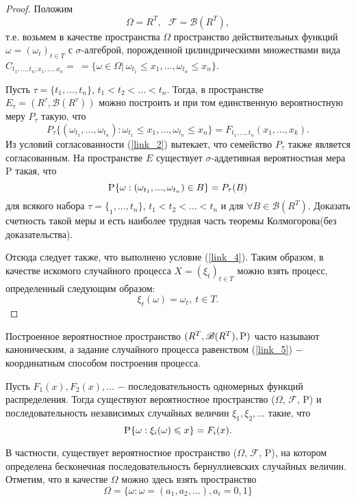 \begin{proof} Положим
$$\Omega = R^T, \ \ \  \mathscr{F} = \mathscr{B}(R^T),$$
т.е. возьмем в качестве пространства $\Omega$ пространство действительных функций $\omega = (\omega_t)_{t \in T}$ с $\sigma$-алгеброй, порожденной цилиндрическими множествами вида $C_{t_1,...,t_n;x_1,...,x_n} = \ =\{ \omega \in \Omega| \ \omega_{t_1} \leq x_1, ... , \omega_{t_n} \leq x_n\} $.

Пусть $\tau = \{t_1, ... , t_n\}$, $t_1 < t_2 < ... < t_n$. Тогда, в пространстве $E_\tau=(R^\tau, \mathscr{B}(R^\tau))$ можно построить и при том единственную вероятностную меру $P_\tau$ такую, что
\begin{equation} \label{link_4}
P_\tau \{(\omega_{t_1}, ... , \omega_{t_n}): \omega_{t_1} \leq x_1, ... , \omega_{t_n} \leq x_n \} = F_{t_1, ... , t_n}(x_1, ... , x_k).
\end{equation}
Из условий согласованности (\ref{link_2}) вытекает, что семейство ${P_\tau}$ также является согласованным. На пространстве $E$ существует $\sigma$-аддетивная вероятностная мера P такая, что 
$$\textsc{P}\{\omega: (\omega_{t_1}, ... , \omega_{t_n}) \in B\} = P_\tau(B)$$
для всякого набора $\tau = \{_1, ... , t_n\}$, $t_1 < t_2 < ... < t_n$ и для $\forall B \in \mathscr{B}(R^T)$. Доказать счетность такой меры и есть наиболее трудная часть теоремы Колмогорова(без доказательства).

Отсюда следует также, что выполнено условие (\ref{link_4}). Таким образом, в качестве искомого случайного процесса $X=(\xi_t)_{t \in T}$ можно взять процесс, определенный следующим образом:
\begin{equation} \label{link_5}
\xi_t(\omega) = \omega_t, \ t \in T.
\end{equation}

\end{proof}

\begin{remark} Построенное вероятностное пространство $(R^T, \mathscr{B}(R^T), \textsc{P})$ часто называют каноническим, а задание случайного процесса равенством (\ref{link_5}) $-$ координатным способом построения процесса.
\end{remark}

\begin{corollary} Пусть $F_1(x), F_2(x), ...$  $-$ последовательность одномерных функций распределения. Тогда существуют вероятностное пространство ($\Omega$, $\mathscr{F}$, P) и последовательность независимых случайных величин $\xi_1, \xi_2, ...$ такие, что
\begin{equation}\label{link_6}
\textsc{P}\{ \omega: \xi_i(\omega) \leq x\} = F_i(x).
\end{equation}

В частности, существует вероятностное пространство ($\Omega$, $\mathscr{F}$, P), на котором определена бесконечная последовательность бернуллиевских случайных величин. Отметим, что в качестве $\Omega$ можно здесь взять пространство 
$$\Omega = \{ \omega: \omega=(a_1, a_2, ...), a_i = 0,1 \}$$
\end{corollary}

